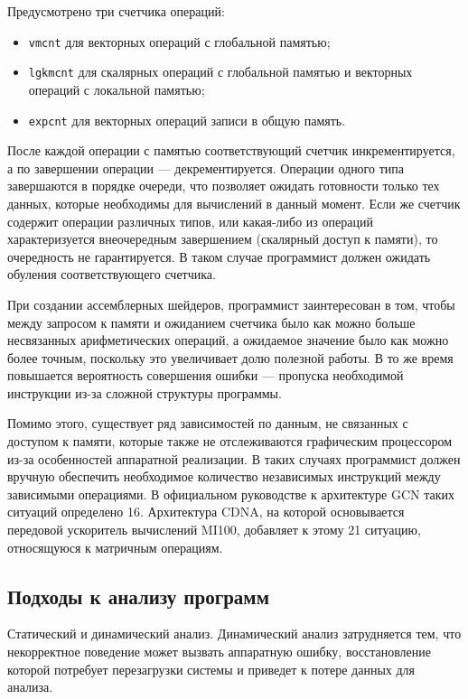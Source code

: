 \documentclass[a4paper,14pt]{extarticle}
\newenvironment{ul}{\begin{itemize}[noitemsep,topsep=0em]}{\end{itemize}\vspace{0.2mm}}
\begin{document}
Предусмотрено три счетчика операций:
\begin{ul}
\item \texttt{vmcnt} для векторных операций с глобальной памятью;
\item \texttt{lgkmcnt} для скалярных операций с глобальной памятью и векторных операций с локальной памятью;
\item \texttt{expcnt} для векторных операций записи в общую память.
\end{ul}

После каждой операции с памятью соответствующий счетчик инкрементируется, а по завершении
операции — декрементируется. Операции одного типа завершаются в порядке очереди, что
позволяет ожидать готовности только тех данных, которые необходимы для вычислений в данный
момент. Если же счетчик содержит операции различных типов, или какая-либо из операций
характеризуется внеочередным завершением (скалярный доступ к памяти), то очередность не гарантируется.
В таком случае программист должен ожидать обуления соответствующего счетчика.

При создании ассемблерных шейдеров, программист заинтересован в том, чтобы между запросом к памяти
и ожиданием счетчика было как можно больше несвязанных арифметических операций, а ожидаемое
значение было как можно более точным, поскольку это увеличивает долю полезной работы. В то же время
повышается вероятность совершения ошибки — пропуска необходимой инструкции из-за сложной структуры программы.

Помимо этого, существует ряд зависимостей по данным, не связанных с доступом к памяти,
которые также не отслеживаются графическим процессором из-за особенностей аппаратной реализации.
В таких случаях программист должен вручную обеспечить необходимое количество независимых
инструкций между зависимыми операциями. В официальном руководстве к архитектуре GCN
таких ситуаций определено 16. Архитектура CDNA, на которой основывается передовой ускоритель
вычислений MI100, добавляет к этому 21 ситуацию, относящуюся к матричным операциям.

\subsection{Подходы к анализу программ}

Статический и динамический анализ. Динамический анализ затрудняется тем, что некорректное
поведение может вызвать аппаратную ошибку, восстановление которой потребует перезагрузки
системы и приведет к потере данных для анализа.  %
\end{document}
